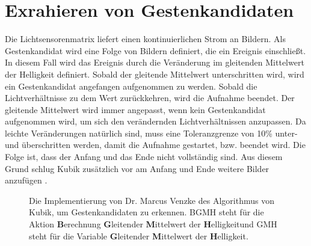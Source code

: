 \section{Exrahieren von Gestenkandidaten}
\label{sec:gesture_extraction}
Die Lichtsensorenmatrix liefert einen kontinuierlichen Strom an Bildern. Als Gestenkandidat wird eine Folge von Bildern definiert, die
ein Ereignis einschließt. In diesem Fall wird das Ereignis durch die Veränderung im gleitenden Mittelwert der Helligkeit definiert. Sobald der gleitende Mittelwert unterschritten wird, wird ein Gestenkandidat
angefangen aufgenommen zu werden. Sobald die Lichtverhältnisse zu dem Wert zurückkehren, wird die Aufnahme beendet. Der gleitende Mittelwert wird immer angepasst, wenn kein Gestenkandidat aufgenommen wird, um
sich den verändernden Lichtverhältnissen anzupassen. Da leichte Veränderungen natürlich sind, muss eine Toleranzgrenze von 10\% unter- und überschritten werden, damit die Aufnahme gestartet, bzw. beendet wird.
Die Folge ist, dass der Anfang und das Ende nicht vollständig sind. Aus diesem Grund schlug Kubik zusätzlich vor am Anfang und Ende weitere Bilder anzufügen \cite{kubikThesis}.
\begin{figure}
    \usetikzlibrary{arrows,automata,positioning}
    \centering
    \caption{Die Implementierung von Dr. Marcus Venzke des Algorithmus von Kubik, um Gestenkandidaten zu erkennen. BGMH steht für die Aktion \glqq \textbf{B}erechnung \textbf{G}leitender \textbf{M}ittelwert der \textbf{H}elligkeit\grqq und GMH steht für die Variable \glqq \textbf{G}leitender \textbf{M}ittelwert der \textbf{H}elligkeit\grqq.}
    \label{fig:venzkeAlgoImpl}
\end{figure}
